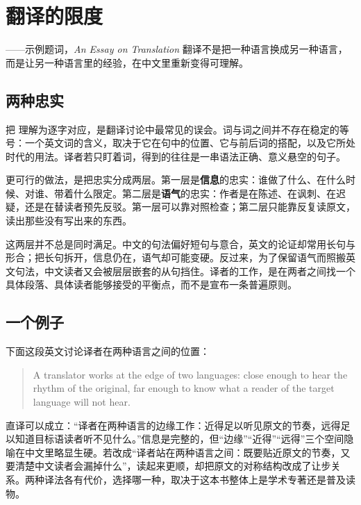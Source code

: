 \chapter{翻译的限度}
\label{ch:01}

\begin{chapterquote}{——示例题词，\textit{An Essay on Translation}}
翻译不是把一种语言换成另一种语言，而是让另一种语言里的经验，在中文里重新变得可理解。
\end{chapterquote}

\section{两种忠实}

把  理解为逐字对应，是翻译讨论中最常见的误会。词与词之间并不存在稳定的等号：一个英文词的含义，取决于它在句中的位置、它与前后词的搭配，以及它所处时代的用法。译者若只盯着词，得到的往往是一串语法正确、意义悬空的句子。

更可行的做法，是把忠实分成两层。第一层是\textbf{信息}的忠实：谁做了什么、在什么时候、对谁、带着什么限定。第二层是\textbf{语气}的忠实：作者是在陈述、在讽刺、在迟疑，还是在替读者预先反驳。第一层可以靠对照检查；第二层只能靠反复读原文，读出那些没有写出来的东西。

这两层并不总是同时满足。中文的句法偏好短句与意合，英文的论证却常用长句与形合；把长句拆开，信息仍在，语气却可能变硬。反过来，为了保留语气而照搬英文句法，中文读者又会被层层嵌套的从句挡住。译者的工作，是在两者之间找一个具体段落、具体读者能够接受的平衡点，而不是宣布一条普遍原则。

\section{一个例子}

下面这段英文讨论译者在两种语言之间的位置：

\begin{quote}
A translator works at the edge of two languages: close enough to hear the rhythm of the original, far enough to know what a reader of the target language will not hear.
\end{quote}

直译可以成立：“译者在两种语言的边缘工作：近得足以听见原文的节奏，远得足以知道目标语读者听不见什么。”信息是完整的，但“边缘”“近得”“远得”三个空间隐喻在中文里略显生硬。若改成“译者站在两种语言之间：既要贴近原文的节奏，又要清楚中文读者会漏掉什么”，读起来更顺，却把原文的对称结构改成了让步关系。两种译法各有代价，选择哪一种，取决于这本书整体上是学术专著还是普及读物。

